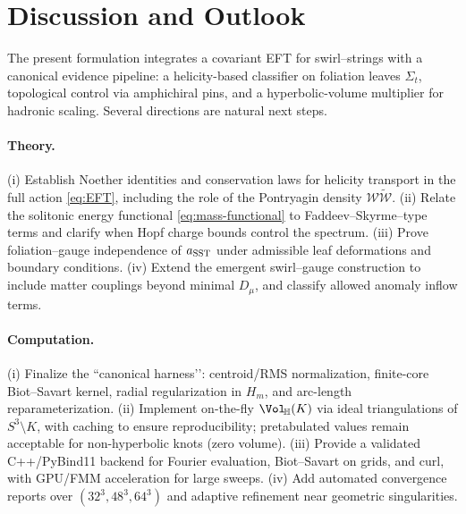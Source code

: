 \documentclass[11pt, preprint,titlepage]{revtex4-2}
\begin{document}
    \section{Discussion and Outlook}

    The present formulation integrates a covariant EFT for swirl–strings with a canonical evidence pipeline: a helicity-based classifier on foliation leaves \(\Sigma_t\), topological control via amphichiral pins, and a hyperbolic-volume multiplier for hadronic scaling. Several directions are natural next steps.

    \paragraph{Theory.}
    (i) Establish Noether identities and conservation laws for helicity transport in the full action \eqref{eq:EFT}, including the role of the Pontryagin density \(\mathcal{W}\tilde{\mathcal{W}}\).
    (ii) Relate the solitonic energy functional \eqref{eq:mass-functional} to Faddeev–Skyrme–type terms and clarify when Hopf charge bounds control the spectrum.
    (iii) Prove foliation–gauge independence of \(a_{\rm SST}\) under admissible leaf deformations and boundary conditions.
    (iv) Extend the emergent swirl–gauge construction to include matter couplings beyond minimal \(D_\mu\), and classify allowed anomaly inflow terms.

    \paragraph{Computation.}
    (i) Finalize the “canonical harness’’: centroid/RMS normalization, finite-core Biot–Savart kernel, radial regularization in \(H_m\), and arc-length reparameterization.
    (ii) Implement on-the-fly \(\Vol_{\!\mathbb{H}}(K)\) via ideal triangulations of \(S^3\!\setminus\!K\), with caching to ensure reproducibility; pretabulated values remain acceptable for non-hyperbolic knots (zero volume).
    (iii) Provide a validated C++/PyBind11 backend for Fourier evaluation, Biot–Savart on grids, and curl, with GPU/FMM acceleration for large sweeps.
    (iv) Add automated convergence reports over \((32^3,48^3,64^3)\) and adaptive refinement near geometric singularities.
\end{document}
